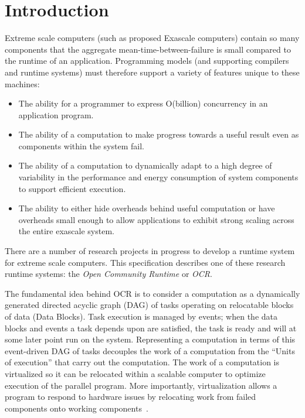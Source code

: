 %

\chapter{Introduction}
\label{chap:introduction}
Extreme scale computers (such as proposed Exascale computers) contain
so many components that the aggregate mean-time-between-failure is small
compared to the runtime of an application. Programming models (and
supporting compilers and runtime systems) must therefore support a
variety of features unique to these machines:
\begin{itemize}
\item The ability for a programmer to
express O(billion) concurrency in an application program.

\item The ability of a computation to make progress towards a useful
result even as components within the system fail.

\item The ability of a computation to dynamically adapt to a high
degree of variability in the performance and energy consumption of
system components to support efficient execution.

\item The ability to either hide overheads behind useful computation
or have overheads small enough to allow applications to exhibit strong
scaling across the entire exascale system.

\end{itemize}

There are a number of research projects in progress to develop a runtime system
for extreme scale computers. This specification describes one of
these research runtime systems: the \emph{Open Community Runtime} or \emph{OCR}.

The fundamental idea behind OCR is to consider a computation as a
dynamically generated directed acyclic graph (DAG) of tasks operating on 
relocatable blocks of data (Data Blocks). Task execution is managed by events;
when the data blocks and events a task depends upon are satisfied, the
task is ready and will at some later point run on the system.   
Representing a computation in terms of this event-driven DAG of tasks 
decouples the work of a computation
from the ``Units of execution'' that carry out the computation.  The work 
of a computation is virtualized so it can be relocated within a scalable computer to
optimize execution of the parallel program. More importantly,
virtualization allows a program to respond to hardware issues by
relocating work from failed components onto working
components~\cite{Vrvilo14}.

